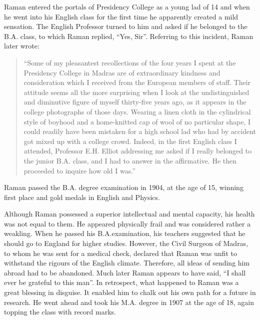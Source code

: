 Raman entered the portals of Presidency College as a young lad of 14 and when he went into his English class for the first time he apparently created a mild sensation. The English Professor turned to him and asked if he belonged to the B.A. class, to which Raman replied, ``Yes, Sir''. Referring to this incident, Raman later wrote:
\begin{quote}
{\fontsize{10pt}{12pt}\selectfont
``Some of my pleasantest recollections of the four years I spent at the Presidency College in Madras are of extraordinary kindness and consideration which I received from the European members of staff. Their attitude seems all the more surprising when I look at the undistinguished and diminutive figure of myself thirty-five years ago, as it appears in the college photographs of those days. Wearing a linen cloth in the cylindrical style of boyhood and a home-knitted cap of wool of no particular shape, I could readily have been mistaken for a high school lad who had by accident got mixed up with a college crowd. Indeed, in the first English class I attended, Professor E.H. \hbox{Elliot} addressing me asked if I really belonged to the junior B.A. class, and I had to answer in the affirmative. He then proceeded to inquire how
old I was.''
}\relax
\end{quote}

Raman passed the B.A. degree examination in 1904, at the age of 15, winning first place and gold medals in English and
Physics.

Although Raman possessed a superior intellectual and mental capacity, his health was not equal to them. He appeared physically frail and was considered rather a weakling. When he passed his B.A.\break examination, his teachers suggested that he should go to England for higher studies. However, the Civil Surgeon of Madras, to whom he was sent for a medical check, declared that Raman was unfit to withstand the rigours of the English climate. Therefore, all ideas of sending him abroad had to be abandoned. Much later Raman appears to have said, ``I shall ever be grateful to this man''. In retrospect, what happened to Raman was a great blessing in disguise. It enabled him to chalk out his own path for a future in research. He went ahead and took his M.A. degree in 1907 at the age of 18, again topping the class with record marks.

